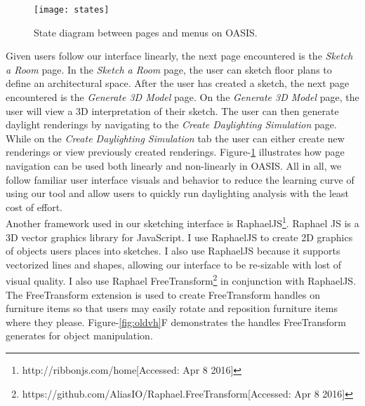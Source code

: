 		\begin{figure}[h]
		\centering
		\texttt{[image: states]}
		\caption{State diagram between pages and menus on OASIS.}
		\label{fig:states}
		\end{figure}

		Given users follow our interface linearly, the next page encountered is the \textit{Sketch a Room} page. 
		In the \textit{Sketch a Room} page, the user can sketch floor plans to define an architectural space.
		After the user has created a sketch, the next page encountered is the \textit{Generate 3D Model} page. 
		On the \textit{Generate 3D Model} page, the user will view a 3D interpretation of their sketch. 
		The user can then generate daylight renderings by navigating to the \textit{Create Daylighting Simulation} page.
		While on the \textit{Create Daylighting Simulation} tab the user can either create new renderings or view previously created renderings.
		Figure-\ref{fig:states} illustrates how page navigation can be used both linearly and non-linearly in OASIS.
		All in all, we follow familiar user interface visuals and behavior to reduce the learning curve of using our tool and allow users to quickly run daylighting analysis with the least cost of effort.\\

		Another framework used in our sketching interface is RaphaelJS\footnote{http://ribbonjs.com/home[Accessed: Apr 8 2016]}.
		Raphael JS is a 3D vector graphics library for JavaScript. 
		I use RaphaelJS to create 2D graphics of objects users places into sketches. I also use RaphaelJS because it supports vectorized lines and shapes, allowing our interface  to be re-sizable with lost of visual quality.
		I also use Raphael FreeTransform\footnote{https://github.com/AliasIO/Raphael.FreeTransform[Accessed: Apr 8 2016]} in conjunction with RaphaelJS. 
		The FreeTransform extension is used to create FreeTransform handles on furniture items so that users may easily rotate and reposition furniture items where they please.
		Figure-\ref{fig:oldvh}F demonstrates the handles FreeTransform generates for object manipulation.\\


